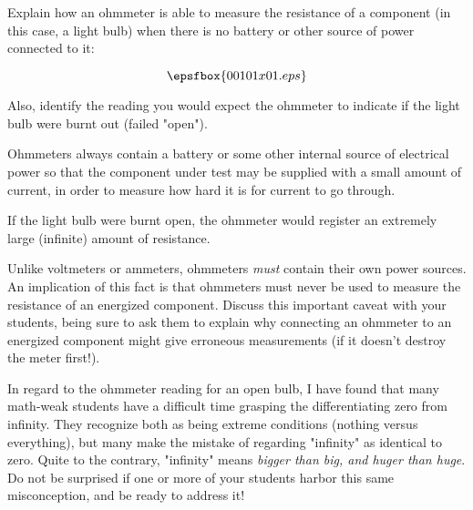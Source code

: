 

Explain how an ohmmeter is able to measure the resistance of a component (in this case, a light bulb) when there is no battery or other source of power connected to it:

$$\epsfbox{00101x01.eps}$$

Also, identify the reading you would expect the ohmmeter to indicate if the light bulb were burnt out (failed "open").







Ohmmeters always contain a battery or some other internal source of electrical power so that the component under test may be supplied with a small amount of current, in order to measure how hard it is for current to go through.

\vskip 10pt

If the light bulb were burnt open, the ohmmeter would register an extremely large (infinite) amount of resistance.







Unlike voltmeters or ammeters, ohmmeters {\it must} contain their own power sources.  An implication of this fact is that ohmmeters must never be used to measure the resistance of an energized component.  Discuss this important caveat with your students, being sure to ask them to explain why connecting an ohmmeter to an energized component might give erroneous measurements (if it doesn't destroy the meter first!).

In regard to the ohmmeter reading for an open bulb, I have found that many math-weak students have a difficult time grasping the differentiating zero from infinity.  They recognize both as being extreme conditions (nothing versus everything), but many make the mistake of regarding "infinity" as identical to zero.  Quite to the contrary, "infinity" means {\it bigger than big, and huger than huge}.  Do not be surprised if one or more of your students harbor this same misconception, and be ready to address it!




